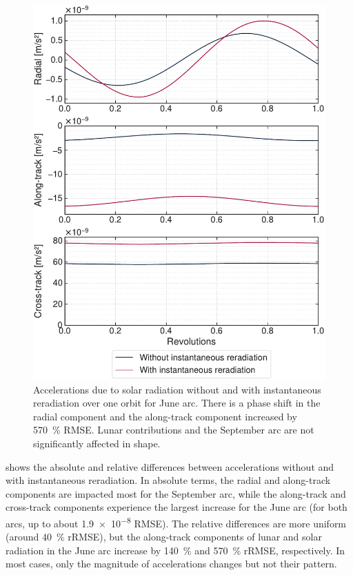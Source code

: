 \begin{figure}[t]
    \centering
    \includegraphics[width=\linewidth]{figures/plots/acc_reradiation_sun_jun.pdf}
    \caption{Accelerations due to solar radiation without and with instantaneous reradiation over one orbit for June arc. There is a phase shift in the radial component and the along-track component increased by \qty{570}{\percent} \gls{RMSE}. Lunar contributions and the September arc are not significantly affected in shape.}
    \label{fig:acc-reradiation}
\end{figure}

 shows the absolute and relative differences between accelerations without and with instantaneous reradiation. In absolute terms, the radial and along-track components are impacted most for the September arc, while the along-track and cross-track components experience the largest increase for the June arc (for both arcs, up to about \qty{1.9e-8}{\acc} \gls{RMSE}). The relative differences are more uniform (around \qty{40}{\percent} \gls{rRMSE}), but the along-track components of lunar and solar radiation in the June arc increase by \qty{140}{\percent} and \qty{570}{\percent} \gls{rRMSE}, respectively. In most cases, only the magnitude of accelerations changes but not their pattern.


